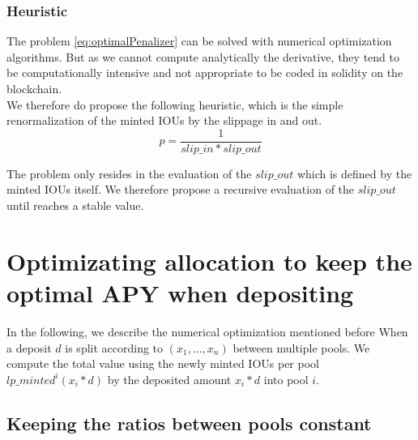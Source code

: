 \documentclass[conference]{IEEEtran}
\begin{document}
\subsubsection{Heuristic}
The problem \ref{eq:optimalPenalizer} can be solved with numerical optimization algorithms. But
as we cannot compute analytically the derivative, they tend to be computationally intensive and not appropriate to be coded in solidity on the blockchain.\\
We therefore do propose the following heuristic, which is the simple renormalization of the minted IOUs by the slippage in and out. 
\begin{equation}\label{eq:optimalHeuristic}
p = \frac{1}{slip\_in * slip\_out}
\end{equation}

The problem only resides in the evaluation of the $slip\_{out}$ which is defined by the minted IOUs itself. 
We therefore propose a recursive evaluation of the $slip\_{out}$ until reaches a stable value.

\section{Optimizating allocation to keep the optimal APY when depositing}
In the following, we describe the numerical optimization mentioned before
When a deposit $d$ is split according to $(x_1,...,x_n)$ between multiple pools. We compute the total value using the newly minted IOUs per pool $lp\_minted^i(x_i * d)$ by the deposited amount $x_i * d$ into pool $i$.  
\subsection{Keeping the ratios between pools constant}
\end{document}
